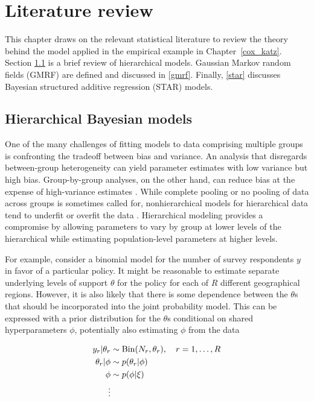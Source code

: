 
\chapter{Literature review}
\label{lit_review}

This chapter draws on the relevant statistical literature to review the theory behind the model applied in the empirical example in Chapter~\ref{cox_katz}. Section \ref{hierarchical} is a brief review of hierarchical models. Gaussian Markov random fields (GMRF) are defined and discussed in \ref{gmrf}. Finally, \ref{star} discusses Bayesian structured additive regression (STAR) models. 

\section{Hierarchical Bayesian models}
\label{hierarchical}

One of the many challenges of fitting models to data comprising multiple groups is confronting the tradeoff between bias and variance. An analysis that disregards between-group heterogeneity can yield parameter estimates with low variance but high bias. Group-by-group analyses, on the other hand, can reduce bias at the expense of high-variance estimates . While complete pooling or no pooling of data across groups is sometimes called for, nonhierarchical models for hierarchical data tend to underfit or overfit the data . Hierarchical modeling provides a compromise by allowing parameters to vary by group at lower levels of the hierarchical while estimating population-level parameters at higher levels. 

For example, consider a binomial model for the number of survey respondents $y$ in favor of a particular policy. It might be reasonable to estimate separate underlying levels of support $\theta$ for the policy for each of $R$ different geographical regions. However, it is also likely that there is some dependence between the $\theta$s that should be incorporated into the joint probability model. This can be expressed with a prior distribution for the $\theta$s conditional on shared hyperparameters $\phi$, potentially also estimating $\phi$ from the data 

\begin{align*}
y_r | \theta_r &\sim {\rm Bin}(N_r, \theta_r), \quad r = 1, \dots, R \\
\theta_r  | \phi &\sim p(\theta_r | \phi) \\
\phi & \sim p(\phi | \xi)  \\
\vdots
\end{align*}

